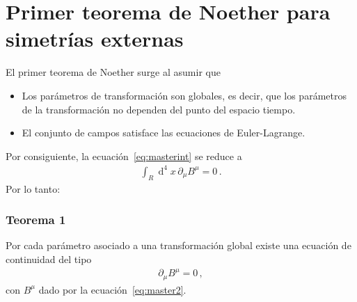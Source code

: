 \section{Primer teorema de Noether para simetrías externas}
El primer teorema de Noether surge al asumir que
\begin{itemize}
\item Los parámetros de transformación son globales, es decir, que los parámetros de la transformación no dependen del punto del espacio tiempo.
\item El conjunto de campos satisface las ecuaciones de Euler-Lagrange.
\end{itemize}

Por consiguiente, la ecuación~\eqref{eq:masterint} se reduce a
\begin{align}
\int_R \operatorname{d}^4x \, \partial_{\mu} B^{\mu}=0\,.
\end{align}
Por lo tanto:

\subsubsection{Teorema 1}
Por  cada parámetro asociado a una transformación global  existe una ecuación de continuidad del tipo
\begin{align}
  \label{eq:dmubmu}
   \partial_{\mu} B^{\mu}=0\,,
\end{align}
con $B^{\mu}$ dado por la ecuación~\eqref{eq:master2}.

